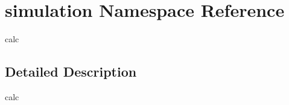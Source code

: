 \hypertarget{namespacesimulation}{}\section{simulation Namespace Reference}
\label{namespacesimulation}


calc  




\subsection{Detailed Description}
calc 